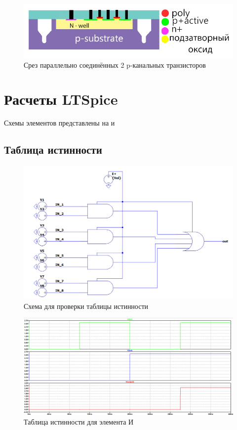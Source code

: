 \documentclass[a4paper,14pt]{article}
\begin{document}
\begin{figure}[H]
	\centering		
	\includegraphics[width=\linewidth]{image/slice_parallel}
	\caption{Срез параллельно соединённых 2 p-канальных транзисторов}\label{img:slice_parallel}
\end{figure}

\section{Расчеты LTSpice}

Схемы элементов представлены на  и 

\subsection{Таблица истинности}

\begin{figure}[H]
	\centering		
	\includegraphics[width=\linewidth]{image/schema_all}
	\caption{Схема для проверки таблицы истинности}\label{img:schema_all}
\end{figure}


\begin{figure}[H]
	\centering		
	\includegraphics[width=\linewidth]{image/spice_and_bin}
	\caption{Таблица истинности для элемента И}\label{img:spice_and_bin}
\end{figure}
\end{document}
